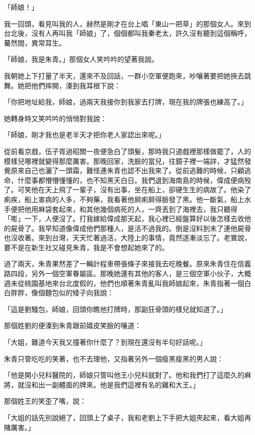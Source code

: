 「師娘！」

我一回頭，看見叫我的人，赫然是剛才在台上唱「東山一把草」的那個女人。來到台北後，沒有人再叫我「師娘」了，個個都叫我秦老太，許久沒有聽到這個稱呼，驀然間，異常耳生。

「師娘，我是朱青。」那個女人笑吟吟的望著我說。

我朝她上下打量了半天，還來不及回話，一群小空軍便跑來，吵嚷著要把她挾去跳舞。她把他們摔開，湊到我耳根下說：

「你把地址給我，師娘，過兩天我接你到我家去打牌，現在我的牌張也練高了。」

她轉身時又笑吟吟的悄悄對我說：

「師娘，剛才我也是老半天才把你老人家認出來呢。」

從前看京戲，伍子胥過昭關一夜便急白了頭髮，那時我只道戲裡那樣做罷了，人的模樣兒哪裡就變得那麼厲害。那晚回家，洗臉的當兒，往鏡子裡一端詳，才猛然發覺原來自己也灑了一頭霜，難怪連朱青也認不出我來了。從前逃難的時候，只顧逃命，什麼事都懵懵懂懂的，也不知黑天白日。我們退到海南島的時候，偉成便病歿了。可笑他在天上飛了一輩子，沒有出事，坐在船上，卻硬生生的病故了。他染了痢疾，船上害病的人多，不夠藥，我看著他屙痢屙得臉發了黑。他一斷氣，船上水手便把他用麻袋套起來，和其他幾個病死的人，一齊丟到了海裡去，我只聽得「嘭」一下，人便沒了。打我嫁給偉成那天起，我心裡已經盤算好以後怎樣去收他的屍骨了。我早知道像偉成他們那種人，是活不過我的。倒是沒料到末了連他屍骨也沒收著。來到台灣，天天忙著過活，大陸上的事情，竟然逐漸淡忘了。老實說，要不是在新生社又碰見朱青，我是不會想起她來了的。

過了兩天，朱青果然差了一輛計程車帶張條子來接我去吃晚餐。原來朱青住在信義路四段，另外一個空軍眷屬區。那晚她還有其他的客人，是三個空軍小伙子，大概週未從桃園基地來台北度假的，他們也順著朱青亂叫我師娘起來，朱青指著一個白白胖胖，像個麵包似的矮子向我說：

「這是劉騷包，師娘，回頭你瞧他打牌時，那副狂骨頭的樣兒就知道了。」

那個姓劉的便湊到朱青跟前嬉皮笑臉的嚷道：

「大姐，難道今天我又撞著你什麼了？到現在還沒有半句好話呢。」

朱青只管吃吃的笑著，也不去理他，又指著另外一個瘦黑瘦黑的男人說：

「他是開小兒科醫院的，師娘只管叫他王小兒科就對了。他和我們打了這麼久的麻將，就沒和出一副體面的牌來。他是我們這裡有名的雞和大王。」

那個姓王的笑歪了嘴，說：

「大姐的話先別說絕了，回頭上了桌子，我和老劉上下手把大姐夾起來，看大姐再賭厲害。」

